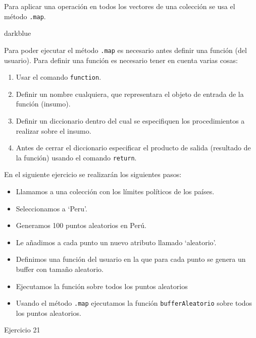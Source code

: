 \documentclass[
  12pt,
  letterpaper,
  twoside]{book}
\providecommand{\tightlist}{%
  \setlength{\itemsep}{0pt}\setlength{\parskip}{0pt}}
\begin{document}
Para aplicar una operación en todos los vectores de una colección se usa el método \texttt{.map}.

\begin{bluebox2}

\begin{awesomeblock}{5pt}{\faLightbulb}{darkblue}

Para poder ejecutar el método \texttt{.map} es necesario antes definir una función (del usuario). Para definir una función es necesario tener en cuenta varias cosas:

\begin{enumerate}
\def\labelenumi{\arabic{enumi}.}
\tightlist
\item
  Usar el comando \texttt{function}.
\item
  Definir un nombre cualquiera, que representara el objeto de entrada de la función (insumo).
\item
  Definir un diccionario dentro del cual se especifiquen los procedimientos a realizar sobre el insumo.
\item
  Antes de cerrar el diccionario especificar el producto de salida (resultado de la función) usando el comando \texttt{return}.
\end{enumerate}

\end{awesomeblock}

\end{bluebox2}

En el siguiente ejercicio se realizarán los siguientes pasos:

\begin{itemize}
\tightlist
\item
  Llamamos a una colección con los límites políticos de los países.
\item
  Seleccionamos a `Peru'.
\item
  Generamos 100 puntos aleatorios en Perú.
\item
  Le añadimos a cada punto un nuevo atributo llamado `aleatorio'.
\item
  Definimos una función del usuario en la que para cada punto se genera un buffer con tamaño aleatorio.
\item
  Ejecutamos la función sobre todos los puntos aleatorios
\item
  Usando el método \texttt{.map} ejecutamos la función \texttt{bufferAleatorio} sobre todos los puntos aleatorios.
\end{itemize}

Ejercicio 21
\end{document}
